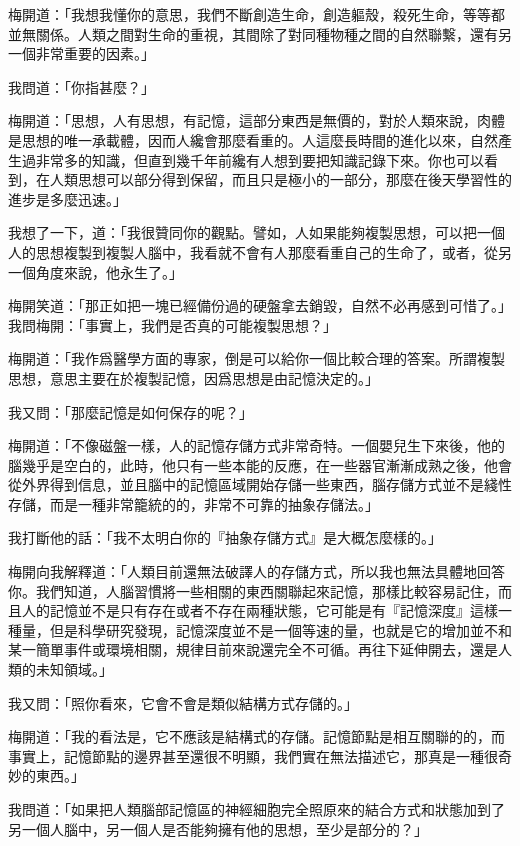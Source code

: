 梅開道：「我想我懂你的意思，我們不斷創造生命，創造軀殼，殺死生命，等等都並無關係。人類之間對生命的重視，其間除了對同種物種之間的自然聯繫，還有另一個非常重要的因素。」

我問道：「你指甚麼？」

梅開道：「思想，人有思想，有記憶，這部分東西是無價的，對於人類來說，肉體是思想的唯一承載體，因而人纔會那麼看重的。人這麼長時間的進化以來，自然產生過非常多的知識，但直到幾千年前纔有人想到要把知識記錄下來。你也可以看到，在人類思想可以部分得到保留，而且只是極小的一部分，那麼在後天學習性的進步是多麼迅速。」

我想了一下，道：「我很贊同你的觀點。譬如，人如果能夠複製思想，可以把一個人的思想複製到複製人腦中，我看就不會有人那麼看重自己的生命了，或者，從另一個角度來說，他永生了。」

梅開笑道：「那正如把一塊已經備份過的硬盤拿去銷毀，自然不必再感到可惜了。」
\\


我問梅開：「事實上，我們是否真的可能複製思想？」

梅開道：「我作爲醫學方面的專家，倒是可以給你一個比較合理的答案。所謂複製思想，意思主要在於複製記憶，因爲思想是由記憶決定的。」

我又問：「那麼記憶是如何保存的呢？」

梅開道：「不像磁盤一樣，人的記憶存儲方式非常奇特。一個嬰兒生下來後，他的腦幾乎是空白的，此時，他只有一些本能的反應，在一些器官漸漸成熟之後，他會從外界得到信息，並且腦中的記憶區域開始存儲一些東西，腦存儲方式並不是綫性存儲，而是一種非常籠統的的，非常不可靠的抽象存儲法。」

我打斷他的話：「我不太明白你的『抽象存儲方式』是大概怎麼樣的。」

梅開向我解釋道：「人類目前還無法破譯人的存儲方式，所以我也無法具體地回答你。我們知道，人腦習慣將一些相關的東西關聯起來記憶，那樣比較容易記住，而且人的記憶並不是只有存在或者不存在兩種狀態，它可能是有『記憶深度』這樣一種量，但是科學研究發現，記憶深度並不是一個等速的量，也就是它的增加並不和某一簡單事件或環境相關，規律目前來說還完全不可循。再往下延伸開去，還是人類的未知領域。」

我又問：「照你看來，它會不會是類似結構方式存儲的。」

梅開道：「我的看法是，它不應該是結構式的存儲。記憶節點是相互關聯的的，而事實上，記憶節點的邊界甚至還很不明顯，我們實在無法描述它，那真是一種很奇妙的東西。」

我問道：「如果把人類腦部記憶區的神經細胞完全照原來的結合方式和狀態加到了另一個人腦中，另一個人是否能夠擁有他的思想，至少是部分的？」

